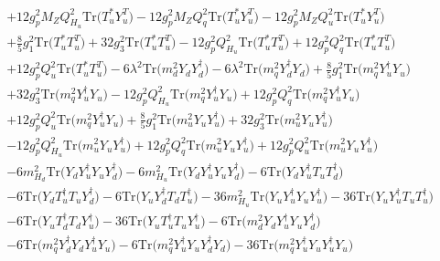 \begin{align}
 &+12 g_{p}^{2} M_Z Q_{H_u}^{2} \mbox{Tr}\Big({T_u^*  Y_{u}^{T}}\Big) -12 g_{p}^{2} M_Z Q_{q}^{2} \mbox{Tr}\Big({T_u^*  Y_{u}^{T}}\Big) -12 g_{p}^{2} M_Z Q_{u}^{2} \mbox{Tr}\Big({T_u^*  Y_{u}^{T}}\Big) \nonumber \\ 
 &+\frac{8}{5} g_{1}^{2} \mbox{Tr}\Big({T_u^*  T_{u}^{T}}\Big) +32 g_{3}^{2} \mbox{Tr}\Big({T_u^*  T_{u}^{T}}\Big) -12 g_{p}^{2} Q_{H_u}^{2} \mbox{Tr}\Big({T_u^*  T_{u}^{T}}\Big) +12 g_{p}^{2} Q_{q}^{2} \mbox{Tr}\Big({T_u^*  T_{u}^{T}}\Big) \nonumber \\ 
 &+12 g_{p}^{2} Q_{u}^{2} \mbox{Tr}\Big({T_u^*  T_{u}^{T}}\Big) -6 \lambda^{2} \mbox{Tr}\Big({m_d^2  Y_d  Y_{d}^{\dagger}}\Big) -6 \lambda^{2} \mbox{Tr}\Big({m_q^2  Y_{d}^{\dagger}  Y_d}\Big) +\frac{8}{5} g_{1}^{2} \mbox{Tr}\Big({m_q^2  Y_{u}^{\dagger}  Y_u}\Big) \nonumber \\ 
 &+32 g_{3}^{2} \mbox{Tr}\Big({m_q^2  Y_{u}^{\dagger}  Y_u}\Big) -12 g_{p}^{2} Q_{H_u}^{2} \mbox{Tr}\Big({m_q^2  Y_{u}^{\dagger}  Y_u}\Big) +12 g_{p}^{2} Q_{q}^{2} \mbox{Tr}\Big({m_q^2  Y_{u}^{\dagger}  Y_u}\Big) \nonumber \\ 
 &+12 g_{p}^{2} Q_{u}^{2} \mbox{Tr}\Big({m_q^2  Y_{u}^{\dagger}  Y_u}\Big) +\frac{8}{5} g_{1}^{2} \mbox{Tr}\Big({m_u^2  Y_u  Y_{u}^{\dagger}}\Big) +32 g_{3}^{2} \mbox{Tr}\Big({m_u^2  Y_u  Y_{u}^{\dagger}}\Big) \nonumber \\ 
 &-12 g_{p}^{2} Q_{H_u}^{2} \mbox{Tr}\Big({m_u^2  Y_u  Y_{u}^{\dagger}}\Big) +12 g_{p}^{2} Q_{q}^{2} \mbox{Tr}\Big({m_u^2  Y_u  Y_{u}^{\dagger}}\Big) +12 g_{p}^{2} Q_{u}^{2} \mbox{Tr}\Big({m_u^2  Y_u  Y_{u}^{\dagger}}\Big) \nonumber \\ 
 &-6 m_{H_d}^2 \mbox{Tr}\Big({Y_d  Y_{u}^{\dagger}  Y_u  Y_{d}^{\dagger}}\Big) -6 m_{H_u}^2 \mbox{Tr}\Big({Y_d  Y_{u}^{\dagger}  Y_u  Y_{d}^{\dagger}}\Big) -6 \mbox{Tr}\Big({Y_d  Y_{u}^{\dagger}  T_u  T_{d}^{\dagger}}\Big) \nonumber \\ 
 &-6 \mbox{Tr}\Big({Y_d  T_{u}^{\dagger}  T_u  Y_{d}^{\dagger}}\Big) -6 \mbox{Tr}\Big({Y_u  Y_{d}^{\dagger}  T_d  T_{u}^{\dagger}}\Big) -36 m_{H_u}^2 \mbox{Tr}\Big({Y_u  Y_{u}^{\dagger}  Y_u  Y_{u}^{\dagger}}\Big) -36 \mbox{Tr}\Big({Y_u  Y_{u}^{\dagger}  T_u  T_{u}^{\dagger}}\Big) \nonumber \\ 
 &-6 \mbox{Tr}\Big({Y_u  T_{d}^{\dagger}  T_d  Y_{u}^{\dagger}}\Big) -36 \mbox{Tr}\Big({Y_u  T_{u}^{\dagger}  T_u  Y_{u}^{\dagger}}\Big) -6 \mbox{Tr}\Big({m_d^2  Y_d  Y_{u}^{\dagger}  Y_u  Y_{d}^{\dagger}}\Big) \nonumber \\ 
 &-6 \mbox{Tr}\Big({m_q^2  Y_{d}^{\dagger}  Y_d  Y_{u}^{\dagger}  Y_u}\Big) -6 \mbox{Tr}\Big({m_q^2  Y_{u}^{\dagger}  Y_u  Y_{d}^{\dagger}  Y_d}\Big) -36 \mbox{Tr}\Big({m_q^2  Y_{u}^{\dagger}  Y_u  Y_{u}^{\dagger}  Y_u}\Big) \nonumber \\ 

\end{align}

